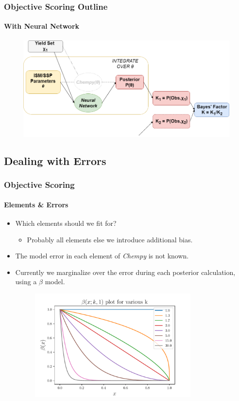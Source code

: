 \documentclass{beamer}
\begin{document}
\begin{frame}
\frametitle{Objective Scoring Outline}
\framesubtitle{With Neural Network}
\begin{figure}
\centering
\includegraphics[width=\textwidth]{Neural2.png}
\end{figure}
\end{frame}

\subsection{Dealing with Errors}
\begin{frame}
\frametitle{Objective Scoring}
\framesubtitle{Elements \& Errors}
\begin{itemize}
\item Which elements should we fit for?
\begin{itemize}
\item Probably all elements else we introduce additional bias.
\end{itemize}
\item The model error in each element of \textit{Chempy} is not known. 
\item Currently we marginalize over the error during each posterior calculation, using a  $\beta$ model.
\begin{figure}
\centering
\includegraphics[width=0.8\textwidth]{beta.pdf}
\end{figure}
\end{itemize}
\end{frame}
\end{document}
